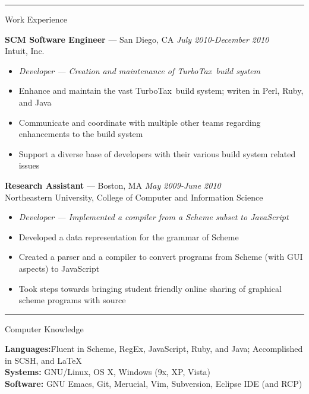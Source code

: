 \documentclass[10pt]{letter}
\begin{document}
\rule{\linewidth}{.5pt}

{\Large Work Experience}
\begin{tabbing}
{\large \bf SCM Software Engineer} --- San Diego, CA \` \textit{July 2010-December 2010} \\
Intuit, Inc.

\end{tabbing}\vspace{-10pt}

\begin{itemize}
\setlength\itemsep{1pt}
\item [] \textit{Developer --- Creation and maintenance of TurboTax\textregistered~build system}
\item Enhance and maintain the vast TurboTax\textregistered~build system; writen in Perl, Ruby, and Java
\item Communicate and coordinate with multiple other teams regarding enhancements to the build system
\item Support a diverse base of developers with their various build system related issues
\end{itemize}

\begin{tabbing}
{\large \bf Research Assistant} --- Boston, MA \` \textit{May 2009-June 2010} \\
Northeastern University, College of Computer and Information Science
\end{tabbing}\vspace{-10pt}
\begin{itemize}
\setlength\itemsep{1pt}
\item [] \textit{Developer --- Implemented a compiler from a Scheme subset to JavaScript}
\item Developed a data representation for the grammar of Scheme
\item Created a parser and a compiler to convert programs from Scheme (with GUI aspects) to JavaScript
\item Took steps towards bringing student friendly online sharing of graphical scheme programs with source
\end{itemize}

\rule{\linewidth}{.5pt}

{\Large Computer Knowledge}
\begin{tabbing}
\textbf{Languages:}\hspace{.2in}\= Fluent in Scheme, RegEx, JavaScript, Ruby,
                   and Java; Accomplished in SCSH, and \LaTeX\\
\textbf{Systems:}\> GNU/Linux, OS X, Windows (9x, XP, Vista)\\
\textbf{Software:}\> GNU Emacs, Git, Merucial, Vim, Subversion,
                     Eclipse IDE (and RCP)
\end{tabbing}\vspace{-15pt}
\end{document}
